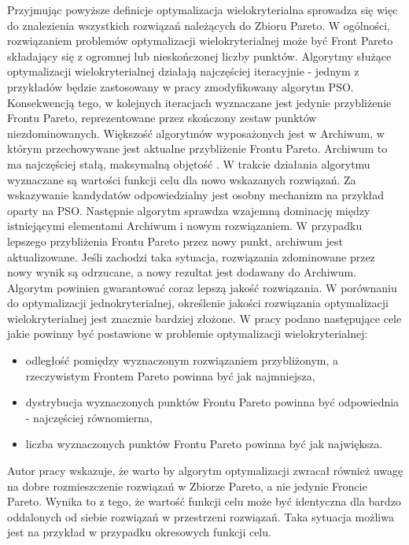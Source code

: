 Przyjmując powyższe definicje optymalizacja wielokryterialna sprowadza się więc do znalezienia wszystkich rozwiązań należących do Zbioru Pareto. W ogólności, rozwiązaniem problemów optymalizacji wielokryterialnej może być Front Pareto składający się z ogromnej lub nieskończonej liczby punktów. Algorytmy służące optymalizacji wielokryterialnej działają najczęściej iteracyjnie - jednym z przykładów będzie zastosowany w pracy zmodyfikowany algorytm PSO. Konsekwencją tego, w kolejnych iteracjach wyznaczane jest jedynie przybliżenie Frontu Pareto, reprezentowane przez skończony zestaw punktów niezdominowanych. Większość algorytmów wyposażonych jest w Archiwum, w którym przechowywane jest aktualne przybliżenie Frontu Pareto. Archiwum to ma najczęściej stałą, maksymalną objętość \parencite{Banach2017}. W trakcie działania algorytmu wyznaczane są wartości funkcji celu dla nowo wskazanych rozwiązań. Za wskazywanie kandydatów odpowiedzialny jest osobny mechanizm na przykład oparty na PSO. Następnie algorytm sprawdza wzajemną dominację między istniejącymi elementami Archiwum i nowym rozwiązaniem. W przypadku lepszego przybliżenia Frontu Pareto przez nowy punkt, archiwum jest aktualizowane. Jeśli zachodzi taka sytuacja, rozwiązania zdominowane przez nowy wynik są odrzucane, a nowy rezultat jest dodawany do Archiwum. Algorytm powinien gwarantować coraz lepszą jakość rozwiązania. W porównaniu do optymalizacji jednokryterialnej, określenie jakości rozwiązania optymalizacji wielokryterialnej jest znacznie bardziej złożone. W pracy \cite{Zitzler2000} podano następujące cele jakie powinny być postawione w problemie optymalizacji wielokryterialnej:
\begin{itemize}
	\item odległość pomiędzy wyznaczonym rozwiązaniem przybliżonym, a rzeczywistym Frontem Pareto powinna być jak najmniejsza,
	\item dystrybucja wyznaczonych punktów Frontu Pareto powinna być odpowiednia - najczęściej równomierna,
	\item liczba wyznaczonych punktów Frontu Pareto powinna być jak największa.
\end{itemize}

Autor pracy \cite{Banach2017} wskazuje, że warto by algorytm optymalizacji zwracał również uwagę na dobre rozmieszczenie rozwiązań w Zbiorze Pareto, a nie jedynie Froncie Pareto. Wynika to z tego, że wartość funkcji celu może być identyczna dla bardzo oddalonych od siebie rozwiązań w przestrzeni rozwiązań. Taka sytuacja możliwa jest na przykład w przypadku okresowych funkcji celu.

